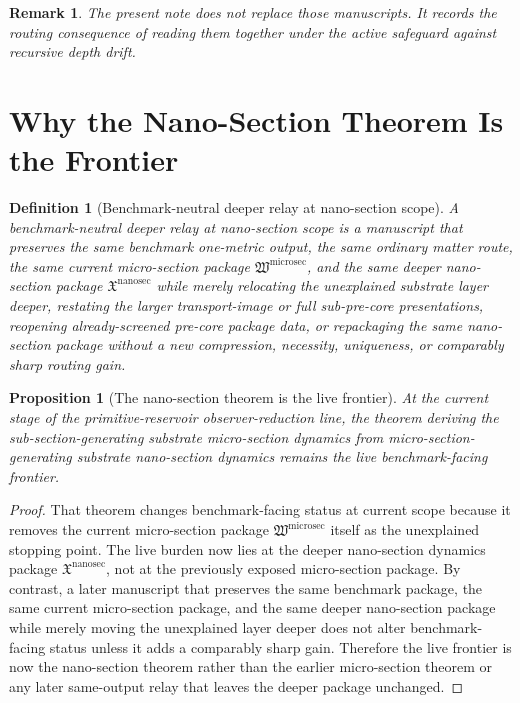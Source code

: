 \documentclass[11pt]{article}
\newcommand{\MicroSectionPackage}{\mathfrak W^{\mathrm{microsec}}}
\newcommand{\NanoSectionPackage}{\mathfrak X^{\mathrm{nanosec}}}
\newtheorem{definition}{Definition}
\newtheorem{proposition}{Proposition}
\newtheorem{remark}{Remark}
\begin{document}
\begin{remark}
The present note does not replace those manuscripts. It records the routing consequence of reading them together under the active safeguard against recursive depth drift.
\end{remark}

\section{Why the Nano-Section Theorem Is the Frontier}

\begin{definition}[Benchmark-neutral deeper relay at nano-section scope]
A \emph{benchmark-neutral deeper relay at nano-section scope} is a manuscript that preserves the same benchmark one-metric output, the same ordinary matter route, the same current micro-section package \(\MicroSectionPackage\), and the same deeper nano-section package \(\NanoSectionPackage\) while merely relocating the unexplained substrate layer deeper, restating the larger transport-image or full sub-pre-core presentations, reopening already-screened pre-core package data, or repackaging the same nano-section package without a new compression, necessity, uniqueness, or comparably sharp routing gain.
\end{definition}

\begin{proposition}[The nano-section theorem is the live frontier]
At the current stage of the primitive-reservoir observer-reduction line, the theorem deriving the sub-section-generating substrate micro-section dynamics from micro-section-generating substrate nano-section dynamics remains the live benchmark-facing frontier.
\end{proposition}

\begin{proof}
That theorem changes benchmark-facing status at current scope because it removes the current micro-section package \(\MicroSectionPackage\) itself as the unexplained stopping point. The live burden now lies at the deeper nano-section dynamics package \(\NanoSectionPackage\), not at the previously exposed micro-section package. By contrast, a later manuscript that preserves the same benchmark package, the same current micro-section package, and the same deeper nano-section package while merely moving the unexplained layer deeper does not alter benchmark-facing status unless it adds a comparably sharp gain. Therefore the live frontier is now the nano-section theorem rather than the earlier micro-section theorem or any later same-output relay that leaves the deeper package unchanged.
\end{proof}
\end{document}
